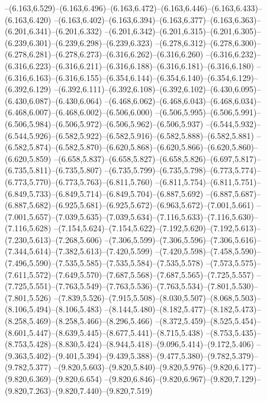   --(6.163,6.529)--(6.163,6.496)--(6.163,6.472)--(6.163,6.446)--(6.163,6.433)--(6.163,6.420)%
  --(6.163,6.402)--(6.163,6.394)--(6.163,6.377)--(6.163,6.363)--(6.201,6.341)--(6.201,6.332)%
  --(6.201,6.342)--(6.201,6.315)--(6.201,6.305)--(6.239,6.301)--(6.239,6.298)--(6.239,6.323)%
  --(6.278,6.312)--(6.278,6.300)--(6.278,6.281)--(6.278,6.273)--(6.316,6.262)--(6.316,6.260)%
  --(6.316,6.232)--(6.316,6.223)--(6.316,6.211)--(6.316,6.188)--(6.316,6.181)--(6.316,6.180)%
  --(6.316,6.163)--(6.316,6.155)--(6.354,6.144)--(6.354,6.140)--(6.354,6.129)--(6.392,6.129)%
  --(6.392,6.111)--(6.392,6.108)--(6.392,6.102)--(6.430,6.095)--(6.430,6.087)--(6.430,6.064)%
  --(6.468,6.062)--(6.468,6.043)--(6.468,6.034)--(6.468,6.007)--(6.468,6.002)--(6.506,6.000)%
  --(6.506,5.995)--(6.506,5.991)--(6.506,5.984)--(6.506,5.972)--(6.506,5.962)--(6.506,5.937)%
  --(6.544,5.932)--(6.544,5.926)--(6.582,5.922)--(6.582,5.916)--(6.582,5.888)--(6.582,5.881)%
  --(6.582,5.874)--(6.582,5.870)--(6.620,5.868)--(6.620,5.866)--(6.620,5.860)--(6.620,5.859)%
  --(6.658,5.837)--(6.658,5.827)--(6.658,5.826)--(6.697,5.817)--(6.735,5.811)--(6.735,5.807)%
  --(6.735,5.799)--(6.735,5.798)--(6.773,5.774)--(6.773,5.770)--(6.773,5.763)--(6.811,5.760)%
  --(6.811,5.754)--(6.811,5.751)--(6.849,5.733)--(6.849,5.714)--(6.849,5.704)--(6.887,5.692)%
  --(6.887,5.687)--(6.887,5.682)--(6.925,5.681)--(6.925,5.672)--(6.963,5.672)--(7.001,5.661)%
  --(7.001,5.657)--(7.039,5.635)--(7.039,5.634)--(7.116,5.633)--(7.116,5.630)--(7.116,5.628)%
  --(7.154,5.624)--(7.154,5.622)--(7.192,5.620)--(7.192,5.613)--(7.230,5.613)--(7.268,5.606)%
  --(7.306,5.599)--(7.306,5.596)--(7.306,5.616)--(7.344,5.614)--(7.382,5.613)--(7.420,5.599)%
  --(7.420,5.598)--(7.458,5.590)--(7.496,5.590)--(7.535,5.585)--(7.535,5.584)--(7.535,5.578)%
  --(7.573,5.575)--(7.611,5.572)--(7.649,5.570)--(7.687,5.568)--(7.687,5.565)--(7.725,5.557)%
  --(7.725,5.551)--(7.763,5.549)--(7.763,5.536)--(7.763,5.534)--(7.801,5.530)--(7.801,5.526)%
  --(7.839,5.526)--(7.915,5.508)--(8.030,5.507)--(8.068,5.503)--(8.106,5.494)--(8.106,5.483)%
  --(8.144,5.480)--(8.182,5.477)--(8.182,5.473)--(8.258,5.469)--(8.258,5.466)--(8.296,5.466)%
  --(8.372,5.459)--(8.525,5.454)--(8.601,5.447)--(8.639,5.445)--(8.677,5.441)--(8.715,5.438)%
  --(8.753,5.435)--(8.753,5.428)--(8.830,5.424)--(8.944,5.418)--(9.096,5.414)--(9.172,5.406)%
  --(9.363,5.402)--(9.401,5.394)--(9.439,5.388)--(9.477,5.380)--(9.782,5.379)--(9.782,5.377)%
  --(9.820,5.603)--(9.820,5.840)--(9.820,5.976)--(9.820,6.177)--(9.820,6.369)--(9.820,6.654)%
  --(9.820,6.846)--(9.820,6.967)--(9.820,7.129)--(9.820,7.263)--(9.820,7.440)--(9.820,7.519)%
